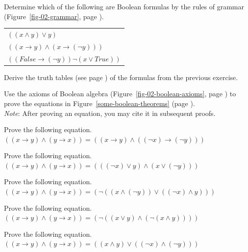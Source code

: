 \begin{ExerciseList}

\Exercise Determine which of the following are Boolean formulas
by the rules of grammar (Figure~\ref{fig-02-grammar}, page \pageref{fig-02-grammar}).
\begin{center}
\begin{tabular}{l}
$((x \wedge y) \vee y )$ \\
$((x \rightarrow y) \wedge (x \rightarrow (\neg y)))$ \\
$((False \rightarrow (\neg y)) \neg (x \vee True))$ \\
\end{tabular}
\end{center}

\Exercise Derive the truth tables (see page \pageref{truth-tables})
of the formulas from the previous exercise.

\Exercise Use the axioms of Boolean algebra
(Figure~\ref{fig-02-boolean-axioms}, page \pageref{fig-02-boolean-axioms})
to prove the equations in
Figure~\ref{some-boolean-theorems} (page \pageref{some-boolean-theorems}).\\
\emph{Note}: After proving an equation, you may cite it in subsequent proofs.

\Exercise\label{ex:boolean-equiv1}
Prove the following equation.\\
\hspace*{1cm} $((x \rightarrow y) \wedge (y \rightarrow x)) = ((x \rightarrow y) \wedge ((\neg x) \rightarrow (\neg y)))$

\Exercise\label{ex:boolean-equiv2}
Prove the following equation.\\
\hspace*{1cm} $((x \rightarrow y) \wedge (y \rightarrow x)) = (((\neg x) \vee y) \wedge (x \vee (\neg y)))$

\Exercise\label{ex:boolean-equiv-notxor2}
Prove the following equation.\\
\hspace*{1cm} $((x \rightarrow y) \wedge (y \rightarrow x)) = (\neg((x \wedge (\neg y)) \vee ((\neg x) \wedge y)))$

\Exercise\label{ex:boolean-equiv-notxor}
Prove the following equation.\\
\hspace*{1cm} $((x \rightarrow y) \wedge (y \rightarrow x)) = (\neg((x \vee y) \wedge (\neg(x \wedge y))))$

\Exercise\label{ex:boolean-equiv4}
Prove the following equation.\\
\hspace*{1cm} $((x \rightarrow y) \wedge (y \rightarrow x)) = ((x \wedge y) \vee ((\neg x) \wedge (\neg y)))$

\end{ExerciseList}

